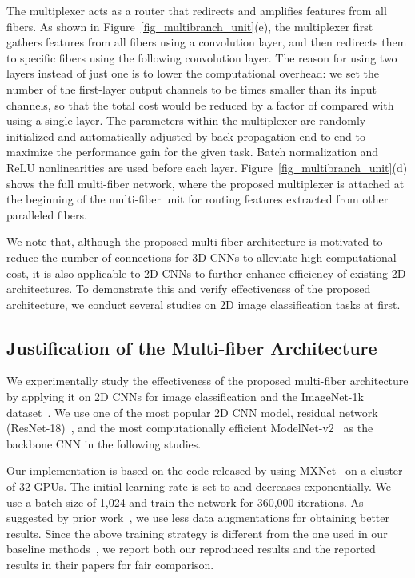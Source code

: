 \documentclass[runningheads]{llncs}
\newcommand{\ourslong}[0]{multi-fiber\xspace}
\newcommand{\ourslongcap}[0]{Multi-fiber\xspace}
\newcommand{\switch}[0]{multiplexer\xspace}
\begin{document}
The \switch acts as a router that redirects and amplifies features from all fibers. As shown in Figure~\ref{fig_multibranch_unit}(e), the \switch first gathers features from all fibers using a  convolution layer, and then redirects them to specific fibers using the following  convolution layer. The reason for using two  layers instead of just one is to lower the computational overhead: we set the number of the first-layer output channels to be  times smaller than its input channels, so that the total cost would be reduced by a factor of  compared with using a single  layer. The parameters within the \switch are randomly initialized and automatically adjusted by back-propagation end-to-end to maximize the performance gain for the given task. Batch normalization and ReLU nonlinearities are used before each layer. 
Figure~\ref{fig_multibranch_unit}(d) shows the full \ourslong network, where the proposed \switch is attached at the beginning of the multi-fiber unit for routing features extracted from other paralleled fibers. 

We note that, although the proposed \ourslong architecture is motivated to reduce the number of connections for 3D CNNs to alleviate high computational cost, it is also applicable to 2D CNNs to further enhance  efficiency of existing 2D architectures. To demonstrate this and verify  effectiveness of the proposed architecture, we conduct several  studies on 2D image classification tasks at first.

\subsection{Justification of the \ourslongcap Architecture}


We experimentally study the effectiveness of the proposed \ourslong architecture by applying it on 2D CNNs for image classification and the ImageNet-1k dataset~\cite{krizhevsky2012imagenet}. We use one of the most popular 2D CNN model, residual network (ResNet-18)~\cite{he2016deep}, and  the most computationally efficient ModelNet-v2~\cite{sandler2018inverted} as the backbone CNN in the following studies.

Our implementation is based on the code released by \cite{chen2017dual} using MXNet~\cite{chen2015mxnet} on a cluster of 32 GPUs. The initial learning rate is set to  and decreases exponentially. We use a batch size of 1,024 and train the network for 360,000 iterations. As suggested by prior work~\cite{howard2017mobilenets}, we use less data augmentations for obtaining better results. Since the above training strategy is different from the one used in our baseline methods~\cite{he2016deep,sandler2018inverted}, we report both our reproduced results and the reported results in their papers for fair comparison.
\end{document}
